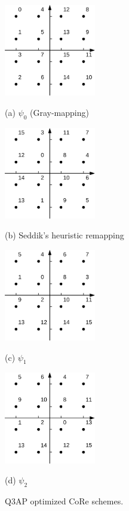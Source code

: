 \documentclass[conference]{IEEEtran}
\begin{document}
\begin{figure}[!t]
    \begin{minipage}[b]{0.48\linewidth}
      \centering
      \centerline{\includegraphics[width=4.0cm]{./figs/gray.eps}}
      \centerline{(a) $\psi_0$ (Gray-mapping)}\medskip
    \end{minipage}
    \hfill
    \begin{minipage}[b]{0.48\linewidth}
      \centering
      \centerline{\includegraphics[width=4.0cm]{./figs/karim.eps}}
      \centerline{(b) Seddik's heuristic remapping~\cite{seddik2008trans}}\medskip
    \end{minipage}
    \begin{minipage}[b]{0.48\linewidth}
      \centering
      \centerline{\includegraphics[width=4.0cm]{./figs/psi1.eps}}
      \centerline{(c) $\psi_1$}\medskip
    \end{minipage}
    \hfill
    \begin{minipage}[b]{.48\linewidth}
      \centering
      \centerline{\includegraphics[width=4.0cm]{./figs/psi2.eps}}
      \centerline{(d) $\psi_2$}\medskip
    \end{minipage}
    \caption{Q3AP optimized CoRe schemes.}
    \label{fig:example}
\end{figure}
\end{document}
